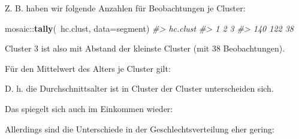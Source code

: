 \documentclass[12pt,]{book}
\makeatletter
\newenvironment{Shaded}{\begin{snugshade}}{\end{snugshade}}
\newcommand{\KeywordTok}[1]{\textcolor[rgb]{0.13,0.29,0.53}{\textbf{{#1}}}}
\newcommand{\DataTypeTok}[1]{\textcolor[rgb]{0.13,0.29,0.53}{{#1}}}
\newcommand{\StringTok}[1]{\textcolor[rgb]{0.31,0.60,0.02}{{#1}}}
\newcommand{\CommentTok}[1]{\textcolor[rgb]{0.56,0.35,0.01}{\textit{{#1}}}}
\newcommand{\NormalTok}[1]{{#1}}
\newenvironment{kframe}{%
\medskip{}
\setlength{\fboxsep}{.8em}
 \def\at@end@of@kframe{}%
 \ifinner\ifhmode%
  \def\at@end@of@kframe{\end{minipage}}%
  \begin{minipage}{\columnwidth}%
 \fi\fi%
 \def\FrameCommand##1{\hskip\@totalleftmargin \hskip-\fboxsep
 \colorbox{shadecolor}{##1}\hskip-\fboxsep
     \hskip-\linewidth \hskip-\@totalleftmargin \hskip\columnwidth}%
 \MakeFramed {\advance\hsize-\width
   \@totalleftmargin\z@ \linewidth\hsize
   \@setminipage}}%
 {\par\unskip\endMakeFramed%
 \at@end@of@kframe}
\renewenvironment{Shaded}{\begin{kframe}}{\end{kframe}}
\makeatother
\begin{document}
Z. B. haben wir folgende Anzahlen für Beobachtungen je Cluster:

\begin{Shaded}
\begin{Highlighting}[]
\NormalTok{mosaic::}\KeywordTok{tally}\NormalTok{(~hc.clust, }\DataTypeTok{data=}\NormalTok{segment)}
\CommentTok{#> hc.clust}
\CommentTok{#>   1   2   3 }
\CommentTok{#> 140 122  38}
\end{Highlighting}
\end{Shaded}

Cluster 3 ist also mit Abstand der kleinste Cluster (mit 38
Beobachtungen).

Für den Mittelwert des Alters je Cluster gilt:

\begin{Shaded}
\end{Shaded}

D. h. die Durchschnittsalter ist in Cluster der Cluster unterscheiden
sich.

Das spiegelt sich auch im Einkommen wieder:

\begin{Shaded}
\end{Shaded}

Allerdings sind die Unterschiede in der Geschlechtsverteilung eher
gering:
\end{document}
